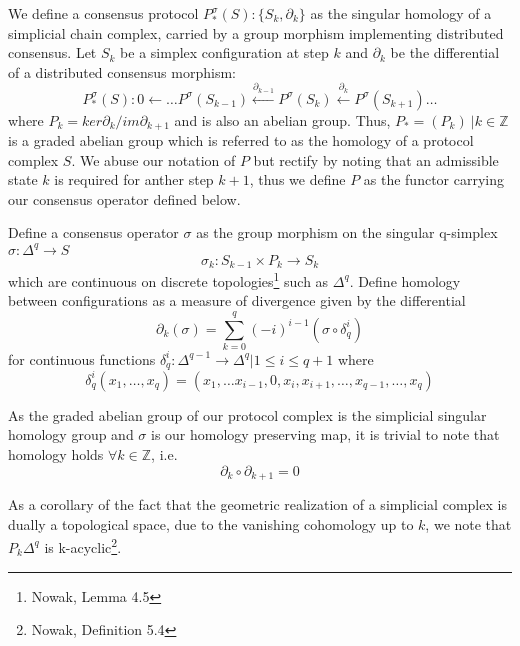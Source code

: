 \documentclass{article}
\begin{document}
We define a consensus protocol $P^\sigma_{*}(S):\{S_k, \partial_k\}$ as the singular homology of a simplicial chain complex, carried by a group morphism implementing distributed consensus. Let $S_k$ be a simplex configuration at step $k$ and $\partial_k$ be the differential of a distributed consensus morphism:
\begin{equation} \label{eq1}
P^\sigma_{*}(S): 0 \leftarrow \dots P^\sigma(S_{k-1})\xleftarrow {\partial_{k-1}} P^\sigma(S_{k})\xleftarrow {\partial_{k}} P^\sigma(S_{k+1}) \dots
\end{equation} \label{eq1}
where $P_k = ker \partial_k / im \partial_{k+1}$ and is also an abelian group. Thus, $P_*= (P_k) \ | k \in \mathbb{Z}$ is a graded abelian group which is referred to as the homology of a protocol complex $S$. We abuse our notation of $P$ but rectify by noting that an admissible state $k$ is required for anther step $k + 1$, thus we define $P$ as the functor carrying our consensus operator defined below.

Define a consensus operator $\sigma$ as the group morphism on the singular q-simplex $\sigma: \Delta^q \rightarrow S$ 
\begin{equation} \label{eq1}
\sigma_k: S_{k-1} \times P_k \rightarrow S_{k}
\end{equation} \label{eq1}
which are continuous on discrete topologies\footnote{Nowak, Lemma 4.5} such as $\Delta^q$. Define homology between configurations as a measure of divergence given by the differential 
\begin{equation} \label{eq1}
\partial_k(\sigma) = \sum^{q}_{k=0} (-i)^{i-1}(\sigma \circ \delta_q^{i} )
\end{equation} \label{eq1}
for continuous functions $\delta^{i}_q: \Delta^{q-1} \rightarrow \Delta^q | 1 \leq i \leq q+1$ where 
\begin{equation} \label{eq1}
\delta^{i}_q(x_1, \dots, x_q) = (x_1, \dots x_{i-1}, 0, x_i, x_{i+1}, \dots, x_{q-1}, \dots, x_q)
\end{equation} \label{eq1}

As the graded abelian group of our protocol complex is the simplicial singular homology group and $\sigma$ is our homology preserving map, it is trivial to note that homology holds $\forall k \in \mathbb{Z}$, i.e.
\begin{equation} \label{eq1}
\partial_k \circ \partial_{k+1} = 0
\end{equation} \label{eq1}

As a corollary of the fact that the geometric realization of a simplicial complex is dually a topological space, due to the vanishing cohomology up to $k$, we note that $P_k\Delta^q$ is k-acyclic\footnote{Nowak, Definition 5.4}.
\end{document}
